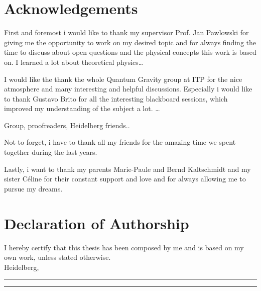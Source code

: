\thispagestyle{plain}
\section*{Acknowledgements}
First and foremost i would like to thank my supervisor Prof. Jan Pawlowski for giving me the opportunity to work on my desired topic and for always finding the time to discuss about open questions and the physical concepts this work is based on. I learned a lot about theoretical physics\dots

I would like the thank the whole Quantum Gravity group at ITP for the nice atmosphere and many interesting and  helpful discussions. Especially i would like to thank Gustavo Brito for all the interesting blackboard sessions, which improved  my understanding of the subject a lot. \dots 

Group, proofreaders, Heidelberg friends..


Not to forget, i have to thank all my friends for the amazing time we spent together during the last years.

Lastly, i want to thank my parents Marie-Paule and Bernd Kaltschmidt and my sister C\'{e}line for their constant support and love and for always allowing me to pursue my dreams.  
 

\section*{Declaration of Authorship}
I hereby certify that this thesis has been composed by me and is based on my own work, unless stated otherwise.\\

Heidelberg, \rule{30mm}{.15mm} \hfill \rule{50mm}{.15mm} \par


